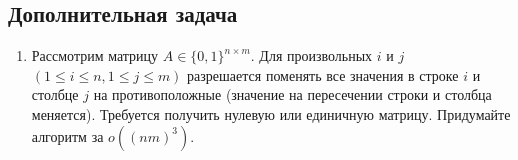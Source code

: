 \subsection{Дополнительная задача}
\begin{enumerate}
	\item Рассмотрим матрицу $A \in \{ 0, 1 \}^{n \times m }$. Для произвольных $i$ и $j$ $(1 \leqslant i 
	\leqslant n, 1 \leqslant j \leqslant m)$ разрешается поменять все значения в строке $i$ и столбце $j$ на 
	противоположные (значение на пересечении строки и столбца меняется). Требуется получить нулевую или единичную 
	матрицу. Придумайте алгоритм за $o((nm)^3)$.
\end{enumerate}



